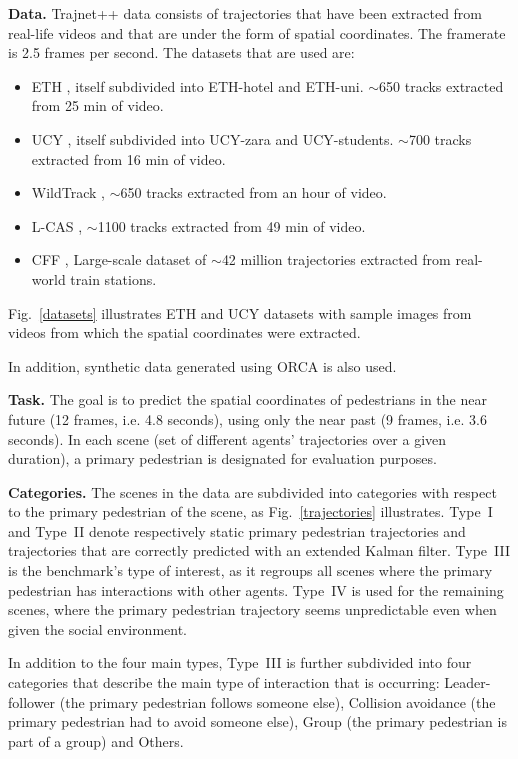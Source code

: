\documentclass[conference]{IEEEtran}
\newcommand{\block}{\textbf}
\begin{document}
\block{Data.} Trajnet++ data consists of trajectories that have been extracted from real-life videos and that are under the form of spatial coordinates. The framerate is 2.5 frames per second.
The datasets that are used are:
\begin{itemize}
    \item ETH \cite{pellegrini2010improving}, itself subdivided into ETH-hotel and ETH-uni. $\sim$650 tracks extracted from 25 min of video.
    \item UCY \cite{leal2014learning}, itself subdivided into UCY-zara and UCY-students. $\sim$700 tracks extracted from 16 min of video.
    \item WildTrack \cite{chavdarova2018wildtrack}, $\sim$650 tracks extracted from an hour of video.
    \item L-CAS \cite{sun20183dof}, $\sim$1100 tracks extracted from 49 min of video.
    \item CFF \cite{alahi2014socially}, Large-scale dataset of $\sim$42 million trajectories extracted from real-world train stations.
\end{itemize}
Fig.~\ref{datasets} illustrates ETH and UCY datasets with sample images from videos from which the spatial coordinates were extracted.

In addition, synthetic data generated using ORCA \cite{orca} is also used.

\block{Task.} The goal is to predict the spatial coordinates of pedestrians in the near future (12 frames, i.e. 4.8 seconds), using only the near past (9 frames, i.e. 3.6 seconds). In each scene (set of different agents' trajectories over a given duration), a primary pedestrian is designated for evaluation purposes.
 
\block{Categories.} The scenes in the data are subdivided into categories with respect to the primary pedestrian of the scene, as Fig.~\ref{trajectories} illustrates. Type~I and Type~II denote respectively static primary pedestrian trajectories and trajectories that are correctly predicted with an extended Kalman filter. Type~III is the benchmark's type of interest, as it regroups all scenes where the primary pedestrian has interactions with other agents. Type~IV is used for the remaining scenes, where the primary pedestrian trajectory seems unpredictable even when given the social environment. 

In addition to the four main types, Type~III is further subdivided into four categories that describe the main type of interaction that is occurring: Leader-follower (the primary pedestrian follows someone else), Collision avoidance (the primary pedestrian had to avoid someone else), Group (the primary pedestrian is part of a group) and Others.
\end{document}
